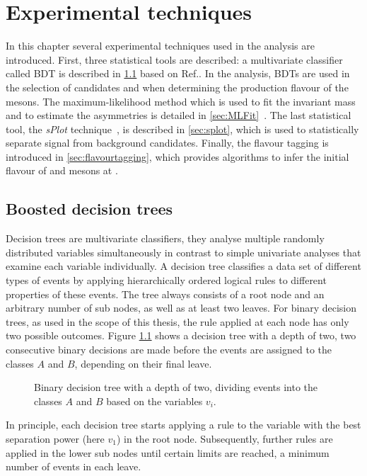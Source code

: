 \chapter{Experimental techniques}
\label{chap:tools}

\linespread{1.08}\selectfont
In this chapter several experimental techniques used in the analysis are introduced.
First, three statistical tools are described:
a multivariate classifier called \ac{BDT} is described in \cref{sec:BDT} based on Ref.\cite{Bohm:389738}.
In the analysis, \ac{BDT}s are used in the selection of \BdToDpi candidates and when determining the production flavour of the \Bz mesons.
The maximum-likelihood method which is used to fit the invariant \Bz mass and to estimate the \CP asymmetries is detailed in \cref{sec:MLFit}~\cite{Bohm:389738}.
The last statistical tool, the \emph{sPlot} technique~\cite{Pivk:2004ty}, is described in \cref{sec:splot}, which is used to statistically separate signal from background candidates.
Finally, the flavour tagging is introduced in \cref{sec:flavourtagging}, which provides algorithms to infer the initial flavour of \Bz and \Bs mesons at \lhcb.

\section{Boosted decision trees}
\label{sec:BDT}

Decision trees are multivariate classifiers, \ie they analyse multiple randomly distributed variables simultaneously in contrast to simple univariate analyses that examine each variable individually.
A decision tree classifies a data set of different types of events by applying hierarchically ordered logical rules to different properties of these events.
The tree always consists of a root node and an arbitrary number of sub nodes, as well as at least two leaves.
For binary decision trees, as used in the scope of this thesis, the rule applied at each node has only two possible outcomes.
Figure \ref{fig:BDTexample} shows a decision tree with a depth of two, \ie two consecutive binary decisions are made before the events are assigned to the classes $A$ and $B$, depending on their final leave.
\begin{figure}[tbp]
    \centering
    
    \caption{Binary decision tree with a depth of two, dividing events into the classes $A$ and $B$ based on the variables $v_i$.}
    \label{fig:BDTexample}
\end{figure}
In principle, each decision tree starts applying a rule to the variable with the best separation power (here $v_1$) in the root node.
Subsequently, further rules are applied in the lower sub nodes until certain limits are reached, \eg a minimum number of events in each leave.

